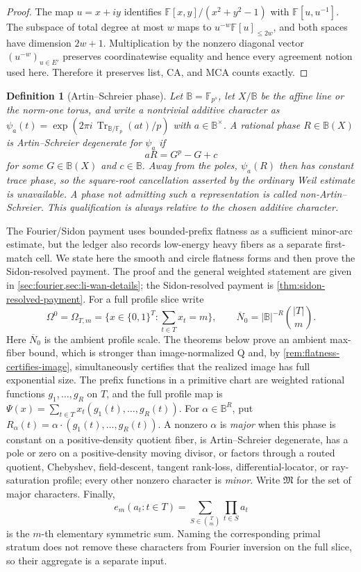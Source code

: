 \documentclass[12pt,a4paper]{amsart}
\numberwithin{equation}{section}
\newtheorem{definition}[definition]{Definition}
\theoremstyle{remark}
\newcommand{\F}{\mathbb F}
\newcommand{\B}{\mathbb B}
\newcommand{\barN}{\overline N}
\newcommand{\abs}[1]{\lvert #1\rvert}
\begin{document}
\begin{proof}
The map \(u=x+iy\) identifies \(\F[x,y]/(x^2+y^2-1)\) with \(\F[u,u^{-1}]\).  The subspace of total degree at most \(w\) maps to \(u^{-w}\F[u]_{\le2w}\), and both spaces have dimension \(2w+1\).  Multiplication by the nonzero diagonal vector \((u^{-w})_{u\in E'}\) preserves coordinatewise equality and hence every agreement notion used here.  Therefore it preserves list, CA, and MCA counts exactly.
\end{proof}

\begin{definition}[Artin--Schreier phase]
\label{def:artin-schreier-phase}
Let \(\B=\F_{p^s}\), let \(X/\B\) be the affine line or the norm-one
torus, and write a nontrivial additive character as
\(\psi_a(t)=\exp(2\pi i\,\operatorname{Tr}_{\B/\F_p}(at)/p)\) with
\(a\in\B^\times\).  A rational phase \(R\in\B(X)\) is
\emph{Artin--Schreier degenerate for \(\psi_a\)} if
\[
                 aR=G^p-G+c
\]
for some \(G\in\B(X)\) and \(c\in\B\).  Away from the poles,
\(\psi_a(R)\) then has constant trace phase, so the square-root
cancellation asserted by the ordinary Weil estimate is unavailable.
A phase not admitting such a representation is called
\emph{non-Artin--Schreier}.  This qualification is always relative to
the chosen additive character.
\end{definition}

The Fourier/Sidon payment uses bounded-prefix flatness as a sufficient minor-arc estimate, but the ledger also records low-energy heavy fibers as a separate first-match cell.  We state here the smooth and circle flatness forms and then prove the Sidon-resolved payment.  The proof and the general weighted statement are given in \cref{sec:fourier,sec:li-wan-details}; the Sidon-resolved payment is \cref{thm:sidon-resolved-payment}.  For a full profile slice write
\[
        \Omega^0=\Omega_{T,m}=\{x\in\{0,1\}^{T}:\sum_{t\in T}x_t=m\},
        \qquad
        \barN_0=\abs\B^{-R}\binom{\abs T}{m}.
\]
Here \(\barN_0\) is the ambient profile scale.  The theorems below prove
an ambient max-fiber bound, which is stronger than image-normalized Q and,
by \cref{rem:flatness-certifies-image}, simultaneously certifies that the
realized image has full exponential size.
The prefix functions in a primitive chart are weighted rational functions
\(g_1,\ldots,g_R\) on \(T\), and the full profile map is
\(\Psi(x)=\sum_{t\in T}x_t(g_1(t),\ldots,g_R(t))\).  For
\(\alpha\in\B^R\), put
\(R_\alpha(t)=\alpha\cdot(g_1(t),\ldots,g_R(t))\).  A nonzero \(\alpha\)
is \emph{major} when this phase is constant on a positive-density quotient
fiber, is Artin--Schreier degenerate, has a pole or zero on a
positive-density moving divisor, or factors through a routed quotient,
Chebyshev, field-descent, tangent rank-loss, differential-locator, or
ray-saturation profile; every other nonzero character is \emph{minor}.
Write \(\mathfrak M\) for the set of major characters.  Finally,
\[
 e_m(a_t:t\in T)=\sum_{S\in\binom Tm}\prod_{t\in S}a_t
\]
is the \(m\)-th elementary symmetric sum.  Naming the
corresponding primal stratum does not remove these characters from Fourier
inversion on the full slice, so their aggregate is a separate input.
\end{document}
